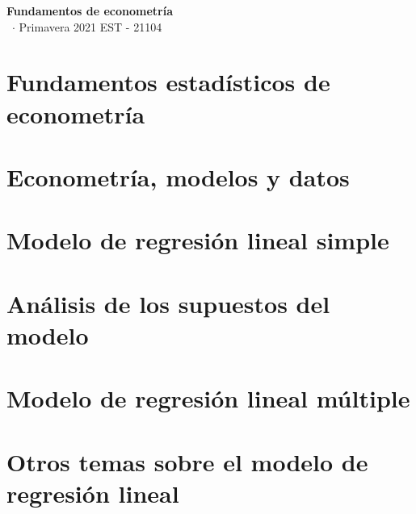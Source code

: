 \documentclass[8pt,a4paper]{extarticle}
\renewcommand{\csClass}{Fundamentos de econometría}
\renewcommand{\csClassCode}{EST - 21104}
\renewcommand{\csTerm}{Primavera 2021}
\begin{document}
\begin{titlepage}
    \begin{center}
	\vspace*{1cm}
	\Huge
        \textbf{\csClass}
	\vspace{0.5cm} \\
	\Large
        \cs\ $\cdot$ \csTerm
        \vfill
        \csAuthorName
	\vspace{0.8cm}
        \csClassCode\\
        \csSchool     
    \end{center}
\end{titlepage}

\begin{multicols}{3}
\setcounter{page}{1}

\section{Fundamentos estadísticos de econometría}

\newpage
\section{Econometría, modelos y datos}

\newpage
\section{Modelo de regresión lineal simple}

\newpage
\section{Análisis de los supuestos del modelo}

\newpage
\section{Modelo de regresión lineal múltiple}

\newpage
\section{Otros temas sobre el modelo de regresión lineal}

\vfill\eject
\columnbreak
\end{multicols}
\end{document}
